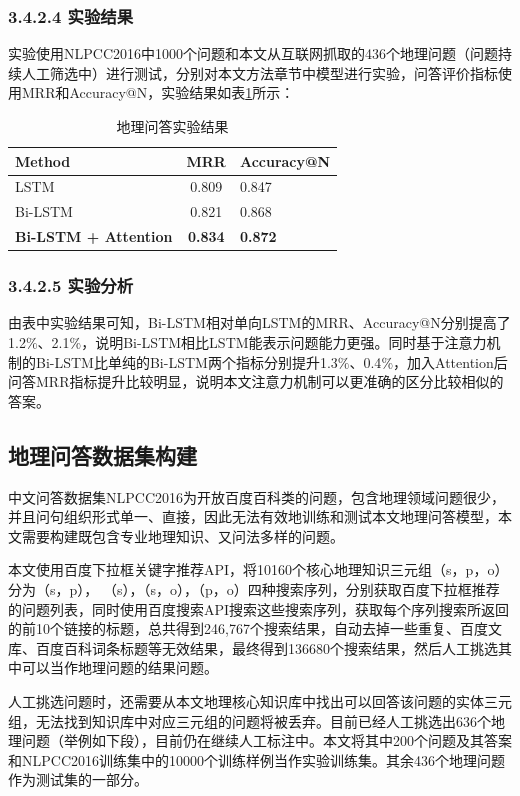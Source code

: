 \subsubsection{3.4.2.4 实验结果}
实验使用NLPCC2016中1000个问题和本文从互联网抓取的436个地理问题（问题持续人工筛选中）进行测试，分别对本文方法章节中模型进行实验，问答评价指标使用MRR和Accuracy@N，实验结果如表\ref{tab:qa_expriment}所示：
\begin{table}[htbp] 
	\centering
	\caption{\label{tab:qa_expriment}地理问答实验结果} 
	\begin{tabular}{lcl}
		\toprule 
		Method	&      MRR & Accuracy@N \\
		\midrule 
		LSTM & 0.809 & 0.847 \\ 
		Bi-LSTM & 0.821 & 0.868 \\ 
		\textbf{Bi-LSTM + Attention} & \textbf{0.834} & \textbf{0.872} \\ 
		\bottomrule 
	\end{tabular} 
\end{table}

\subsubsection{3.4.2.5 实验分析}
由表中实验结果可知，Bi-LSTM相对单向LSTM的MRR、Accuracy@N分别提高了1.2$\%$、2.1$\%$，说明Bi-LSTM相比LSTM能表示问题能力更强。同时基于注意力机制的Bi-LSTM比单纯的Bi-LSTM两个指标分别提升1.3$\%$、0.4$\%$，加入Attention后问答MRR指标提升比较明显，说明本文注意力机制可以更准确的区分比较相似的答案。

\subsection{地理问答数据集构建}
中文问答数据集NLPCC2016为开放百度百科类的问题，包含地理领域问题很少，并且问句组织形式单一、直接，因此无法有效地训练和测试本文地理问答模型，本文需要构建既包含专业地理知识、又问法多样的问题。 

本文使用百度下拉框关键字推荐API，将10160个核心地理知识三元组（s，p，o）分为（s，p），
（s），（s，o），（p，o）四种搜索序列，分别获取百度下拉框推荐的问题列表，同时使用百度搜索API搜索这些搜索序列，获取每个序列搜索所返回的前10个链接的标题，总共得到246,767个搜索结果，自动去掉一些重复、百度文库、百度百科词条标题等无效结果，最终得到136680个搜索结果，然后人工挑选其中可以当作地理问题的结果问题。

人工挑选问题时，还需要从本文地理核心知识库中找出可以回答该问题的实体三元组，无法找到知识库中对应三元组的问题将被丢弃。目前已经人工挑选出636个地理问题（举例如下段），目前仍在继续人工标注中。本文将其中200个问题及其答案和NLPCC2016训练集中的10000个训练样例当作实验训练集。其余436个地理问题作为测试集的一部分。

